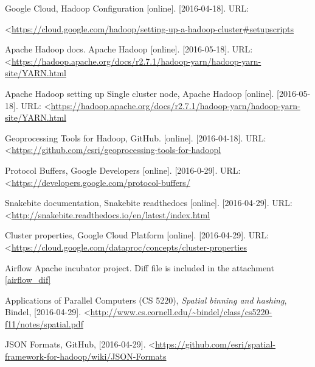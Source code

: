 \documentclass[a4paper,12pt,oneside]{report}
\renewcommand*\thesection{\arabic{section}}
\begin{document}
\begin{thebibliography}{99}
		
		Google Cloud, Hadoop Configuration [online]. [2016-04-18]. 
		URL:
	
\textless\url{https://cloud.google.com/hadoop/setting-up-a-hadoop-cluster#setupscripts}
		
		Apache Hadoop docs. Apache Hadoop [online]. [2016-05-18]. 
		URL:
\textless\url{https://hadoop.apache.org/docs/r2.7.1/hadoop-yarn/hadoop-yarn-site/YARN.html}
		
		Apache Hadoop setting up Single cluster node, Apache Hadoop [online].
		[2016-05-18]. 
		URL:
\textless\url{https://hadoop.apache.org/docs/r2.7.1/hadoop-yarn/hadoop-yarn-site/YARN.html}
		
		
		Geoprocessing Tools for Hadoop, GitHub. [online]. [2016-04-18]. 
		URL: \textless\url{https://github.com/esri/geoprocessing-tools-for-hadoopl}
		
		Protocol Buffers, Google Developers [online]. [2016-0-29]. 
		URL: \textless\url{https://developers.google.com/protocol-buffers/}
		
		Snakebite documentation, Snakebite readthedocs [online]. [2016-04-29]. 
		URL: \textless\url{http://snakebite.readthedocs.io/en/latest/index.html}
		
		Cluster properties, Google Cloud Platform [online]. [2016-04-29]. 
		URL:
		\textless\url{https://cloud.google.com/dataproc/concepts/cluster-properties}
		
		
		Airflow Apache incubator project. Diff file is included in the attachment
		\ref{airflow_dif}
		
		Applications of Parallel Computers (CS 5220), \textit{Spatial binning and
hashing}, Bindel,  [2016-04-29]. 
\textless\url{http://www.cs.cornell.edu/~bindel/class/cs5220-f11/notes/spatial.pdf}
		
		JSON Formats, GitHub,  [2016-04-29]. 
		\textless\url{https://github.com/esri/spatial-framework-for-hadoop/wiki/JSON-Formats}	
		
		
	\end{thebibliography}
	
	

	
	\setcounter{footnote}{1}
	\newpage
	
	\appendix
	
	\renewcommand\thesection{\Alph{section}}
	
	
	
\end{document}
